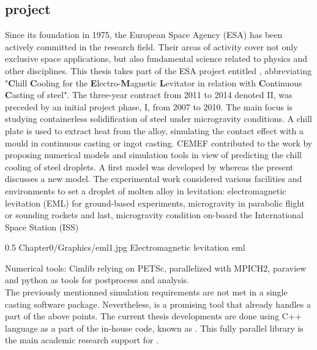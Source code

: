 \subsection*{\ccemlcc project}
Since its foundation in 1975, the European Space Agency (ESA) has been actively committed in the research field.
Their areas of activity cover not only exclusive space applications, but also fundamental science related to 
physics and other disciplines. This thesis takes part of the ESA project entitled \ccemlcc, abbreviating
"\textbf{C}hill \textbf{C}ooling for the \textbf{E}lectro-\textbf{M}agnetic \textbf{L}evitator in relation with 
\textbf{C}ontinuous \textbf{C}asting of steel".
The three-year contract from 2011 to 2014 denoted \ccemlcc II, was preceded by an initial project phase, \ccemlcc I,
from 2007 to 2010. The main focus is studying containerless solidification of steel under microgravity conditions. 
A chill plate is used to extract heat from the alloy, simulating the contact effect with a mould in continuous casting
or ingot casting.
CEMEF contributed to the work by proposing numerical models and simulation tools in view of predicting the chill cooling of steel droplets. 
A first model was developed by \citet{rivaux_simulation_2011} whereas the present discusses a new model. 
The experimental work considered various facilities and environments to set a droplet of molten alloy in levitation: electromagnetic levitation (EML) 
for ground-based experiments, microgravity in parabolic flight or sounding rockets and last, microgravity condition on-board the International Space Station (ISS)

\begin{figureth}
{0.5}
{Chapter0/Graphics/eml1.jpg}
{Electromagnetic levitation}
{eml}
\end{figureth}

Numerical tools: Cimlib relying on PETSc, parallelized with MPICH2, paraview and python as tools for postprocess and analysis. \\
The previously mentionned simulation requirements are not met in a single casting software package. Nevertheless, \thercast is a promising tool that already 
handles a part of the above points. The current thesis developments are done using C++ language as a part of the
in-house code, known as \cimlib \citep{digonnet_cimlib:_2007, mesri_advanced_2009}. 
This fully parallel library is the main academic research support for \thercast.\\ \\ 

